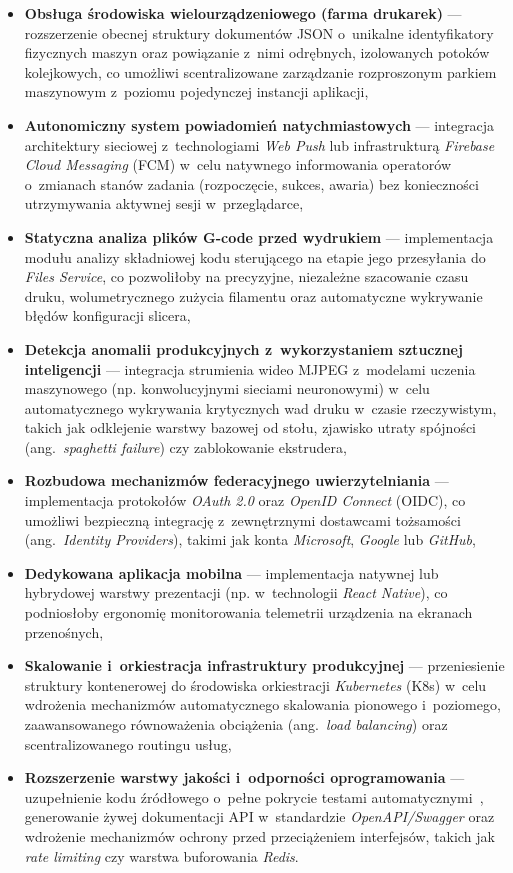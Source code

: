 \documentclass[a4paper,12pt,reqno]{article}
\begin{document}
\begin{itemize}
	\item \textbf{Obsługa środowiska wielourządzeniowego (farma drukarek)} --- rozszerzenie obecnej struktury dokumentów JSON o~unikalne identyfikatory fizycznych maszyn oraz powiązanie z~nimi odrębnych, izolowanych potoków kolejkowych, co umożliwi scentralizowane zarządzanie rozproszonym parkiem maszynowym z~poziomu pojedynczej instancji aplikacji,
	\item \textbf{Autonomiczny system powiadomień natychmiastowych} --- integracja architektury sieciowej z~technologiami \textit{Web Push} lub infrastrukturą \textit{Firebase Cloud Messaging} (FCM) w~celu natywnego informowania operatorów o~zmianach stanów zadania (rozpoczęcie, sukces, awaria) bez konieczności utrzymywania aktywnej sesji w~przeglądarce,
	\item \textbf{Statyczna analiza plików G-code przed wydrukiem} --- implementacja modułu analizy składniowej kodu sterującego na etapie jego przesyłania do \textit{Files Service}, co pozwoliłoby na precyzyjne, niezależne szacowanie czasu druku, wolumetrycznego zużycia filamentu oraz automatyczne wykrywanie błędów konfiguracji slicera,
	\item \textbf{Detekcja anomalii produkcyjnych z~wykorzystaniem sztucznej inteligencji} --- integracja strumienia wideo MJPEG z~modelami uczenia maszynowego (np. konwolucyjnymi sieciami neuronowymi) w~celu automatycznego wykrywania krytycznych wad druku w~czasie rzeczywistym, takich jak odklejenie warstwy bazowej od stołu, zjawisko utraty spójności (ang.~\textit{spaghetti failure}) czy zablokowanie ekstrudera,
	\item \textbf{Rozbudowa mechanizmów federacyjnego uwierzytelniania} --- implementacja protokołów \textit{OAuth 2.0} oraz \textit{OpenID Connect} (OIDC), co umożliwi bezpieczną integrację z~zewnętrznymi dostawcami tożsamości (ang.~\textit{Identity Providers}), takimi jak konta \textit{Microsoft}, \textit{Google} lub \textit{GitHub},
	\item \textbf{Dedykowana aplikacja mobilna} --- implementacja natywnej lub hybrydowej warstwy prezentacji (np. w~technologii \textit{React Native}), co podniosłoby ergonomię monitorowania telemetrii urządzenia na ekranach przenośnych,
	\item \textbf{Skalowanie i~orkiestracja infrastruktury produkcyjnej} --- przeniesienie struktury kontenerowej do środowiska orkiestracji \textit{Kubernetes} (K8s) w~celu wdrożenia mechanizmów automatycznego skalowania pionowego i~poziomego, zaawansowanego równoważenia obciążenia (ang.~\textit{load balancing}) oraz scentralizowanego routingu usług,
	\item \textbf{Rozszerzenie warstwy jakości i~odporności oprogramowania} --- uzupełnienie kodu źródłowego o~pełne pokrycie testami automatycznymi~\cite{martin2022}, generowanie żywej dokumentacji API w~standardzie \textit{OpenAPI/Swagger} oraz wdrożenie mechanizmów ochrony przed przeciążeniem interfejsów, takich jak \textit{rate limiting} czy warstwa buforowania \textit{Redis}.
\end{itemize}
\end{document}
